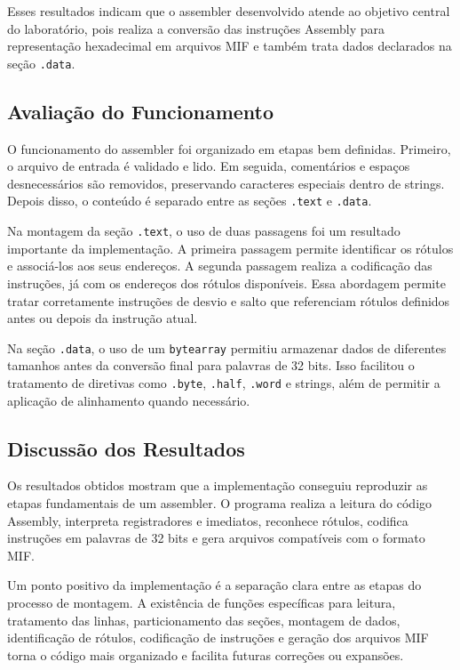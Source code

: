 \documentclass[conference]{IEEEtran}
\begin{document}
Esses resultados indicam que o assembler desenvolvido atende ao objetivo central do laboratório, pois realiza a conversão das instruções Assembly para representação hexadecimal em arquivos MIF e também trata dados declarados na seção \texttt{.data}.

\subsection{Avaliação do Funcionamento}

O funcionamento do assembler foi organizado em etapas bem definidas. Primeiro, o arquivo de entrada é validado e lido. Em seguida, comentários e espaços desnecessários são removidos, preservando caracteres especiais dentro de strings. Depois disso, o conteúdo é separado entre as seções \texttt{.text} e \texttt{.data}.

Na montagem da seção \texttt{.text}, o uso de duas passagens foi um resultado importante da implementação. A primeira passagem permite identificar os rótulos e associá-los aos seus endereços. A segunda passagem realiza a codificação das instruções, já com os endereços dos rótulos disponíveis. Essa abordagem permite tratar corretamente instruções de desvio e salto que referenciam rótulos definidos antes ou depois da instrução atual.

Na seção \texttt{.data}, o uso de um \texttt{bytearray} permitiu armazenar dados de diferentes tamanhos antes da conversão final para palavras de 32 bits. Isso facilitou o tratamento de diretivas como \texttt{.byte}, \texttt{.half}, \texttt{.word} e strings, além de permitir a aplicação de alinhamento quando necessário.

\subsection{Discussão dos Resultados}

Os resultados obtidos mostram que a implementação conseguiu reproduzir as etapas fundamentais de um assembler. O programa realiza a leitura do código Assembly, interpreta registradores e imediatos, reconhece rótulos, codifica instruções em palavras de 32 bits e gera arquivos compatíveis com o formato MIF.

Um ponto positivo da implementação é a separação clara entre as etapas do processo de montagem. A existência de funções específicas para leitura, tratamento das linhas, particionamento das seções, montagem de dados, identificação de rótulos, codificação de instruções e geração dos arquivos MIF torna o código mais organizado e facilita futuras correções ou expansões.
\end{document}
